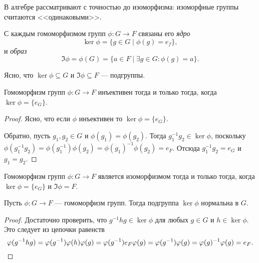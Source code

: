 В алгебре рассматривают с точностью до изоморфизма: изоморфные группы считаются <<одинаковыми>>.

\begin{definition}
    С каждым гомоморфизмом групп $\phi \colon G \to F$ связаны его \textit{ядро}
    \begin{equation*}
        \ker \phi = \{g \in G \mid \phi(g) = e_f\}
    ,\end{equation*}
    и \textit{образ}
    \begin{equation*}
        \Im \phi = \phi(G) = \{a \in F \mid \exists g \in G : \phi(g) = a\}
    .\end{equation*}
\end{definition}

Ясно, что $\ker \phi \subseteq G$ и $\Im \phi \subseteq F$ --- подгруппы.

\begin{lemma}
    Гомоморфизм групп $\phi \colon G \to F$ инъективен тогда и только тогда, когда $\ker \phi = \{e_G\}$.
\end{lemma}

\begin{proof}
    Ясно, что если $\phi$ инъективен то $\ker \phi = \{e_G\}$.

    Обратно, пусть $g_1, g_2 \in G$ и $\phi(g_1) = \phi(g_2)$. Тогда $g_1^{-1} g_2 \in \ker \phi$, поскольку $\phi(g_1^{-1} g_2) = \phi(g_1^{-1}) \phi(g_2) = \phi(g_1)^{-1} \phi(g_2) = e_F$. Отсюда $g_1^{-1} g_2 = e_G$ и $g_1 = g_2$.
\end{proof}

\begin{corollary}
    Гомоморфизм групп $\phi \colon G \to F$ является изоморфизмом тогда и только тогда, когда $\ker \phi = \{e_G\}$ и $\Im \phi = F$.
\end{corollary}

\begin{proposal}
    Пусть $\phi \colon G \to F$ --- гомоморфизм групп. Тогда подгруппа $\ker \phi$ нормальна в $G$.
\end{proposal}

\begin{proof}
    Достаточно проверить, что $g^{-1} h g \in \ker \phi$ для любых $g \in G$ и $h \in \ker \phi$. Это следует из цепочки равенств
    \begin{equation*}
        \phi(g^{-1} h g) = \phi(g^{-1}) \phi(h) \phi(g) = \phi(g^{-1}) e_F \phi(g) = \phi(g^{-1}) \phi(g) = \phi(g)^{-1} \phi(g) = e_F
    .\qedhere\end{equation*}
\end{proof}

